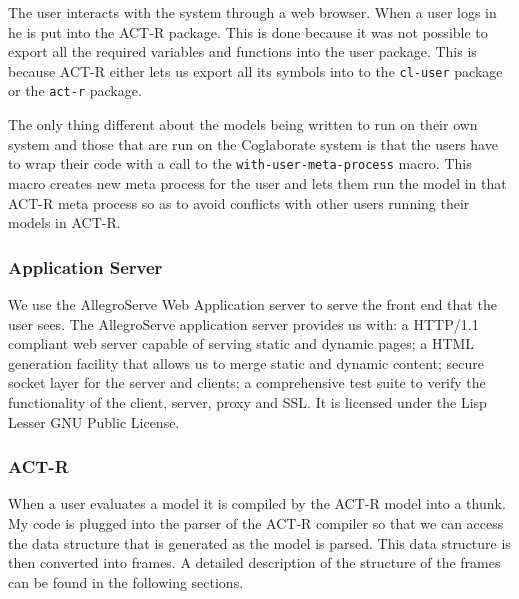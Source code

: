 The user interacts with the system through a web browser. When a user
logs in he is put into the ACT-R package. This is done because it was
not possible to export all the required variables and functions into
the user package. This is because ACT-R either lets us export all its
symbols into to the \texttt{cl-user} package or the \texttt{act-r}
package. 

The only thing different about the models being written to run on
their own system and those that are run on the Coglaborate system is
that the users have to wrap their code with a call to the
\texttt{with-user-meta-process} macro. This macro creates new meta
process for the user and lets them run the model in that ACT-R meta
process so as to avoid conflicts with other users running their models
in ACT-R. 

\subsubsection{Application Server}

We use the AllegroServe Web Application server to serve the front end
that the user sees. The AllegroServe\cite{aserve2009} application server provides us
with: a HTTP/1.1 compliant web server capable of serving static and
dynamic pages; a HTML generation facility that allows us to merge
static and dynamic content; secure socket layer for the server and
clients; a comprehensive test suite to verify the functionality of the
client, server, proxy and SSL. It is licensed under the Lisp Lesser
GNU Public License. 



\subsubsection{ACT-R}

When a user evaluates a model it is compiled by the ACT-R model into a
thunk. My code is plugged into the parser of the ACT-R compiler so
that we can access the data structure that is generated as the model
is parsed. This data structure is then converted into frames. A
detailed description of the structure of the frames can be found in
the following sections.





